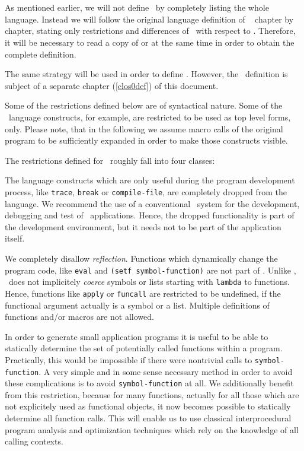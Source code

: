 \section{}

As mentioned earlier, we will not define \ by completely listing
the whole language. Instead we will follow the original language
definition of \CL\ \cite{Steele84} chapter by chapter, stating only
restrictions and differences of \ with respect to \CL.
Therefore, it will be necessary to read a copy of \cite{Steele84} or
\cite{Steele90} at the same time in order to obtain the complete
definition.

The same strategy will be used in order to define . However, the
\ definition is subject of a separate chapter (\ref{clos0def})
of this document.

Some of the restrictions defined below are of syntactical nature. Some
of the \CL\ language constructs, for example, are restricted to be
used as top level forms, only. Please note, that in the following we
assume macro calls of the original program to be sufficiently expanded
in order to make those constructs visible.

The restrictions defined for \ roughly fall into four classes:

The language constructs which are only useful during the program
development process, like {\tt trace}, {\tt break} or {\tt compile-file},
are completely dropped from the language. We recommend the use of a
conventional \CL\ system for the development, debugging and test of
\ applications. Hence, the dropped functionality is part of the
development environment, but it needs not to be part of the
application itself.

We completely disallow {\em reflection}. Functions which dynamically
change the program code, like {\tt eval} and {\tt (setf
symbol-function)} are not part of . Unlike \CL, \ does not
implicitely {\em coerce} symbols or lists starting with {\tt lambda}
to functions. Hence, functions like {\tt apply} or {\tt funcall} are
restricted to be undefined, if the functional argument actually is a
symbol or a list. Multiple definitions of functions and/or macros are
not allowed.

In order to generate small application programs it is useful to be
able to statically determine the set of potentially called functions
within a program. Practically, this would be impossible if there were
nontrivial calls to {\tt symbol-function}. A very simple and in some
sense necessary method in order to avoid these complications is to
avoid {\tt symbol-function} at all. We additionally benefit from this
restriction, because for many functions, actually for all those which
are not explicitely used as functional objects, it now becomes
possible to statically determine all function calls.  This will enable
us to use classical interprocedural program analysis and optimization
techniques which rely on the knowledge of all calling contexts.

